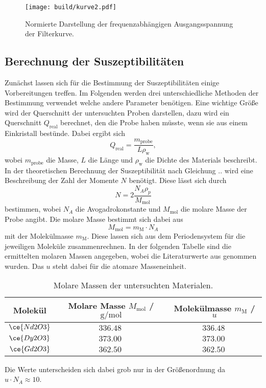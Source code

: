 \begin{figure}
    \centering
    \texttt{[image: build/kurve2.pdf]}
    \caption{Normierte Darstellung der frequenzabhängigen Ausgangsspannung der Filterkurve.} 
    \label{fig:kurve2}
\end{figure}

\newpage
\subsection{Berechnung der Suszeptibilitäten}
 
Zunächst lassen sich für die Bestimmung der Suszeptibilitäten einige Vorbereitungen treffen. Im Folgenden werden drei unterschiedliche Methoden der Bestimmung verwendet welche andere Parameter benötigen.
Eine wichtige Größe wird der Querschnitt der untersuchten Proben darstellen, dazu wird ein Querschnitt $Q_{\text{real}}$ berechnet, den die Probe haben müsste, wenn sie aus einem Einkristall bestünde. Dabei ergibt
sich \cite{skript}
\begin{equation}
Q_{\text{real}} = \frac{m_{\text{probe}}}{L \rho_{\text{w}}},
\end{equation}
wobei $m_{\text{probe}}$ die Masse, $L$ die Länge und $\rho_{\text{w}}$ die Dichte des Materials beschreibt.
\\
In der theoretischen Berechnung der Suszeptibilität nach Gleichung .. wird eine Beschreibung der Zahl der Momente $N$ benötigt.
Diese lässt sich durch 
\begin{equation}
N = 2\frac{N_{A} \rho_{p}}{M_{\text{mol}}}
\end{equation}
bestimmen, wobei $N_{A}$ die Avogadrokonstante \cite{lit} und $M_{\text{mol}}$ die molare Masse der Probe angibt. Die molare Masse bestimmt sich dabei aus \cite{molar}
\begin{equation}
    M_{\text{mol}} = m_{\text{M}} \cdot N_{A}
\end{equation}
mit der Molekülmasse $m_{\text{M}}$. Diese lassen sich aus dem Periodensystem für die jeweiligen Moleküle zusammenrechnen. 
In der folgenden Tabelle sind die ermittelten molaren Massen angegeben, wobei die Literaturwerte aus \cite{lit2} genommen wurden. Das $u$ steht dabei für die atomare Masseneinheit.
\begin{table}
    \caption{Molare Massen der untersuchten Materialen.}
    \centering
    \label{tab:molmass}
    \begin{tabular}{c | c c}
        \toprule
        Molekül & Molare Masse $M_{\text{mol}}$ / $\si{\g\per\mol}$ & Molekülmasse $m_{\text{M}}$ / $u$ \\
        \midrule
        $\ce{Nd2O3}$ & $\SI{336.48}{}$      & $\SI{336.48}{}$\\
        $\ce{Dy2O3}$ & $\SI{373.00}{}$    & $\SI{373.00}{}$\\
        $\ce{Gd2O3}$ & $\SI{362.50}{}$    & $\SI{362.50}{}$\\
        \bottomrule    
    \end{tabular}
\end{table}
Die Werte unterscheiden sich dabei grob nur in der Größenordnung da $u \cdot N_{A} \approx 10$.

